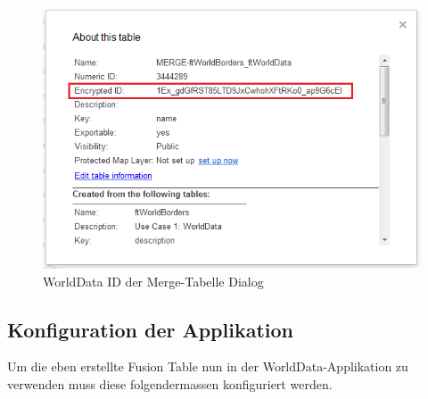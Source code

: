 \begin{figure}[!h]
	\centering
	\includegraphics{images/usecase1-worlddata/documentation/worlddata-prepare_fusiontableslayer4.png}
	\caption{WorldData ID der Merge-Tabelle Dialog}
	\label{worlddata-prepare_fusiontableslayer4}
\end{figure}

\subsection{Konfiguration der Applikation}
Um die eben erstellte Fusion Table nun in der WorldData-Applikation zu verwenden muss diese folgendermassen konfiguriert werden.


